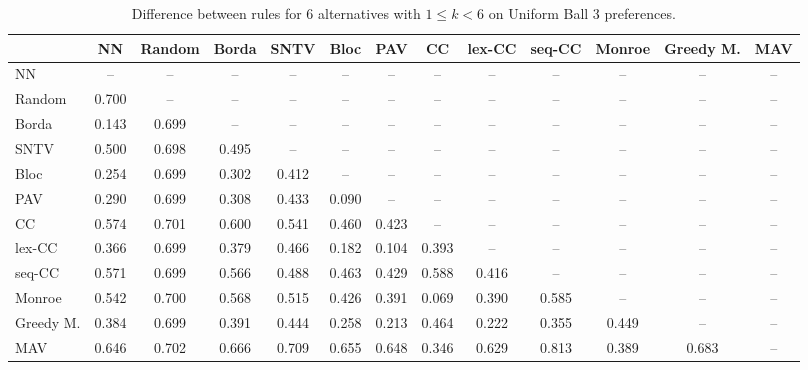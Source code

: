 
\begin{table*}[h!]
\centering
\begin{tabular}{lcccccccccccc}
\toprule
 & NN & Random & Borda & SNTV & Bloc & PAV & CC & lex-CC & seq-CC & Monroe & Greedy M. & MAV \\
\midrule
NN & -- & -- & -- & -- & -- & -- & -- & -- & -- & -- & -- & -- \\
Random & 0.700 & -- & -- & -- & -- & -- & -- & -- & -- & -- & -- & -- \\
Borda & 0.143 & 0.699 & -- & -- & -- & -- & -- & -- & -- & -- & -- & -- \\
SNTV & 0.500 & 0.698 & 0.495 & -- & -- & -- & -- & -- & -- & -- & -- & -- \\
Bloc & 0.254 & 0.699 & 0.302 & 0.412 & -- & -- & -- & -- & -- & -- & -- & -- \\
PAV & 0.290 & 0.699 & 0.308 & 0.433 & 0.090 & -- & -- & -- & -- & -- & -- & -- \\
CC & 0.574 & 0.701 & 0.600 & 0.541 & 0.460 & 0.423 & -- & -- & -- & -- & -- & -- \\
lex-CC & 0.366 & 0.699 & 0.379 & 0.466 & 0.182 & 0.104 & 0.393 & -- & -- & -- & -- & -- \\
seq-CC & 0.571 & 0.699 & 0.566 & 0.488 & 0.463 & 0.429 & 0.588 & 0.416 & -- & -- & -- & -- \\
Monroe & 0.542 & 0.700 & 0.568 & 0.515 & 0.426 & 0.391 & 0.069 & 0.390 & 0.585 & -- & -- & -- \\
Greedy M. & 0.384 & 0.699 & 0.391 & 0.444 & 0.258 & 0.213 & 0.464 & 0.222 & 0.355 & 0.449 & -- & -- \\
MAV & 0.646 & 0.702 & 0.666 & 0.709 & 0.655 & 0.648 & 0.346 & 0.629 & 0.813 & 0.389 & 0.683 & -- \\
\bottomrule
\end{tabular}

\caption{Difference between rules for 6 alternatives with $1 \leq k < 6$ on Uniform Ball 3 preferences.}
\end{table*}
